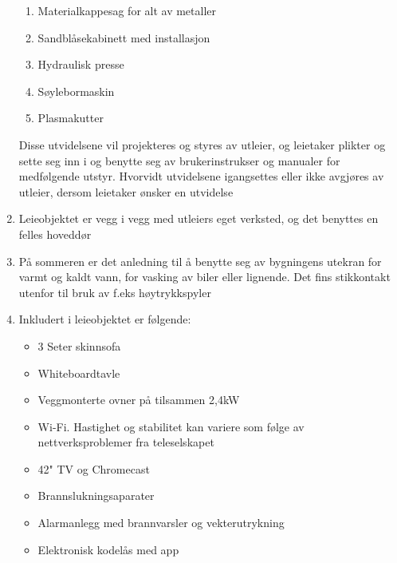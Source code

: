 \begin{enumerate}
\begin{enumerate}
				\item Materialkappesag for alt av metaller

				\item Sandblåsekabinett med installasjon

				\item Hydraulisk presse

				\item Søylebormaskin

				\item Plasmakutter

			\end{enumerate}

			Disse utvidelsene vil projekteres og styres av utleier, og leietaker plikter og sette seg inn i og benytte seg av brukerinstrukser og manualer for medfølgende utstyr. Hvorvidt utvidelsene igangsettes eller ikke avgjøres av utleier, dersom leietaker ønsker en utvidelse

		\item Leieobjektet er vegg i vegg med utleiers eget verksted, og det benyttes en felles hoveddør

		\item På sommeren er det anledning til å benytte seg av bygningens utekran for varmt og kaldt vann, for vasking av biler eller lignende. Det fins stikkontakt utenfor til bruk av f.eks høytrykkspyler

		\item Inkludert i leieobjektet er følgende:

			\begin{itemize}

				\item 3 Seter skinnsofa

				\item Whiteboardtavle

				\item Veggmonterte ovner på tilsammen 2,4kW

				\item Wi-Fi. Hastighet og stabilitet kan variere som følge av nettverksproblemer fra teleselskapet

				\item 42" TV og Chromecast

				\item Brannslukningsaparater

				\item Alarmanlegg med brannvarsler og vekterutrykning

				\item Elektronisk kodelås med app


\end{itemize}
\end{enumerate}
